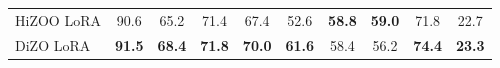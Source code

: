 \begin{table*}[ht]
{\begin{tabular}{lccccccccc}
HiZOO LoRA                                                                   & 90.6           & 65.2          & 71.4          & 67.4           & 52.6          & \textbf{58.8} & \textbf{59.0}    & 71.8                 & 22.7                \\
\rowcolor[gray]{.92}DiZO LoRA                           & \textbf{91.5}  & \textbf{68.4} & \textbf{71.8} & \textbf{70.0}  & \textbf{61.6} & 58.4          & 56.2             & \textbf{74.4}        & \textbf{23.3}       \\
\bottomrule
\end{tabular}
}

\label{opt2p7b-main}
\end{table*}